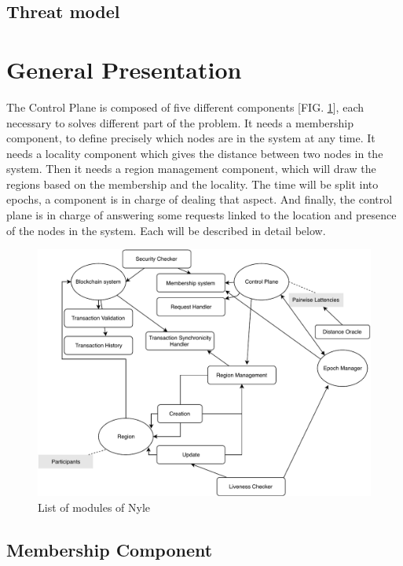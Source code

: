 \documentclass[a4paper,11pt,oneside]{report}
\begin{document}
\subsection{Threat model}

\section{General Presentation}

The Control Plane is composed of five different components [FIG.
\ref{fig:modules}], each necessary to solves different part of the problem. It
needs a membership component, to define precisely which nodes are in the system
at any time. It needs a locality component which gives the distance between two
nodes in the system. Then it needs a region management component, which will
draw the regions based on the membership and the locality. The time will be
split into epochs, a component is in charge of dealing that aspect. And
finally, the control plane is in charge of answering some requests linked to
the location and presence of the nodes in the system. Each will be described in
detail below. 

\begin{figure}[!h] \centering
\includegraphics[width=400pt]{figures/Nyle_components} \caption{List of modules
of Nyle} \label{fig:modules} \end{figure}

\subsection{Membership Component}
\end{document}
